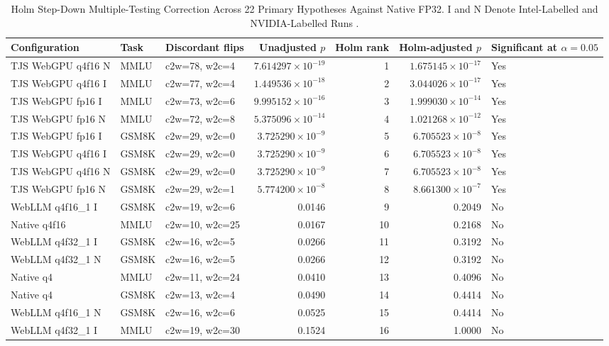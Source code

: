 \documentclass[conference]{IEEEtran}
\begin{document}
\begin{table}[!t]
\caption{
Holm Step-Down Multiple-Testing Correction Across 22 Primary
Hypotheses Against Native FP32.
I and N Denote Intel-Labelled and NVIDIA-Labelled Runs
\cite{repository}.
}
\label{tab:holm}
\centering
\small
\setlength{\tabcolsep}{6pt}
\begin{tabular}{@{}lllrrrl@{}}
\toprule
Configuration &
Task &
Discordant flips &
Unadjusted $p$ &
Holm rank &
Holm-adjusted $p$ &
Significant at $\alpha = 0.05$\\
\midrule
TJS WebGPU q4f16 N & MMLU & c2w=78, w2c=4 & $7.614297\times 10^{-19}$ & 1 & $1.675145\times 10^{-17}$ & Yes\\
TJS WebGPU q4f16 I & MMLU & c2w=77, w2c=4 & $1.449536\times 10^{-18}$ & 2 & $3.044026\times 10^{-17}$ & Yes\\
TJS WebGPU fp16 I & MMLU & c2w=73, w2c=6 & $9.995152\times 10^{-16}$ & 3 & $1.999030\times 10^{-14}$ & Yes\\
TJS WebGPU fp16 N & MMLU & c2w=72, w2c=8 & $5.375096\times 10^{-14}$ & 4 & $1.021268\times 10^{-12}$ & Yes\\
TJS WebGPU fp16 I & GSM8K & c2w=29, w2c=0 & $3.725290\times 10^{-9}$ & 5 & $6.705523\times 10^{-8}$ & Yes\\
TJS WebGPU q4f16 I & GSM8K & c2w=29, w2c=0 & $3.725290\times 10^{-9}$ & 6 & $6.705523\times 10^{-8}$ & Yes\\
TJS WebGPU q4f16 N & GSM8K & c2w=29, w2c=0 & $3.725290\times 10^{-9}$ & 7 & $6.705523\times 10^{-8}$ & Yes\\
TJS WebGPU fp16 N & GSM8K & c2w=29, w2c=1 & $5.774200\times 10^{-8}$ & 8 & $8.661300\times 10^{-7}$ & Yes\\
WebLLM q4f16\_1 I & GSM8K & c2w=19, w2c=6 & 0.0146 & 9 & 0.2049 & No\\
Native q4f16 & MMLU & c2w=10, w2c=25 & 0.0167 & 10 & 0.2168 & No\\
WebLLM q4f32\_1 I & GSM8K & c2w=16, w2c=5 & 0.0266 & 11 & 0.3192 & No\\
WebLLM q4f32\_1 N & GSM8K & c2w=16, w2c=5 & 0.0266 & 12 & 0.3192 & No\\
Native q4 & MMLU & c2w=11, w2c=24 & 0.0410 & 13 & 0.4096 & No\\
Native q4 & GSM8K & c2w=13, w2c=4 & 0.0490 & 14 & 0.4414 & No\\
WebLLM q4f16\_1 N & GSM8K & c2w=16, w2c=6 & 0.0525 & 15 & 0.4414 & No\\
WebLLM q4f32\_1 I & MMLU & c2w=19, w2c=30 & 0.1524 & 16 & 1.0000 & No\\

\end{tabular}
\end{table}
\end{document}
